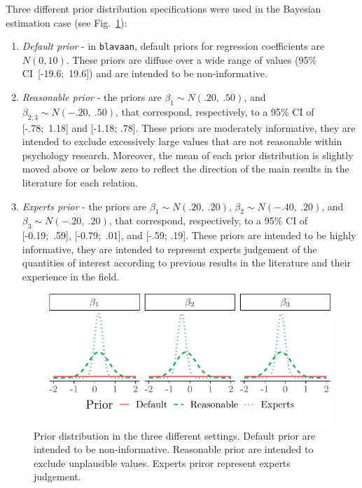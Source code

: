 \documentclass[graybox]{svmult}
\begin{document}
Three different prior distribution specifications were used in the Bayesian estimation case (see Fig.~\ref{fig:prior}):
\begin{enumerate}
	\item{\textit{Default prior} -  in \texttt{blavaan}, default priors for regression coefficients are $N(0,10)$}. These priors are diffuse over a wide range of values (95\% CI\ [-19.6;\ 19.6]) and are intended to be non-informative.
	\item{\textit{Reasonable prior} - the priors are $\beta_1\sim N(.20,\ .50)$, and  $\beta_{2;3}\sim N(-.20,\ .50)$, that correspond, respectively, to a 95\% CI of  [-.78;\ 1.18] and  [-1.18; .78]. These priors are moderately informative, they are intended to exclude excessively large values that are not reasonable within psychology research. Moreover, the mean of each prior distribution is slightly moved above or below zero to reflect the direction of the main results in the literature for each relation.}
 	\item{\textit{Experts prior} - the priors are $\beta_1\sim N(.20,\ .20)$,  $\beta_{2}\sim N(-.40,\ .20)$}, and $\beta_3\sim N(-.20,\ .20)$, that correspond, respectively, to a 95\% CI of  [-0.19;\ .59], [-0.79;\ .01], and  [-.59; .19]. These priors are intended to be highly informative, they are intended to represent experts judgement of the quantities of interest according to previous results in the literature and their experience in the field. %
\end{enumerate}
\begin{figure}[t]
	\sidecaption
	\includegraphics[width = .60\textwidth]{figure/Plot_prior}
	\caption{Prior distribution in the three different settings. Default prior are intended to be non-informative. Reasonable prior  are intended to exclude unplausible values. Experts priror represent experts judgement.}
	\label{fig:prior}
\end{figure}
\end{document}
